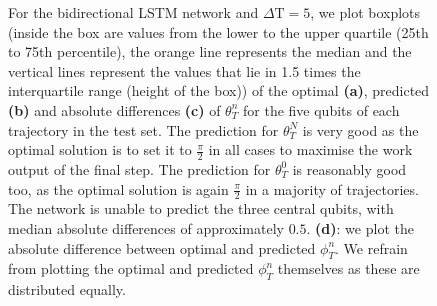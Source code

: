 \begin{figure}[h]
\caption{For the bidirectional LSTM network and $\Delta \mathrm{T} = 5$, we plot boxplots (inside the box are values from the lower to the upper quartile (25th to 75th percentile), the orange line represents the median and the vertical lines represent the values that lie in 1.5 times the interquartile range (height of the box)) of the optimal \textbf{(a)}, predicted \textbf{(b)} and absolute differences \textbf{(c)} of $\theta^n_T$ for the five qubits of each trajectory in the test set. The prediction for $\theta_T^N$ is very good as the optimal solution is to set it to $\frac{\pi}{2}$ in all cases to maximise the work output of the final step. The prediction for $\theta_T^0$ is reasonably good too, as the optimal solution is again $\frac{\pi}{2}$ in a majority of trajectories. The network is unable to predict the three central qubits, with median absolute differences of approximately $0.5$. \textbf{(d)}: we plot the absolute difference between optimal and predicted $\phi_T^n$. We refrain from plotting the optimal and predicted $\phi_T^n$ themselves as these are distributed equally.}
\label{bilstmbox}
\end{figure}

\newpage